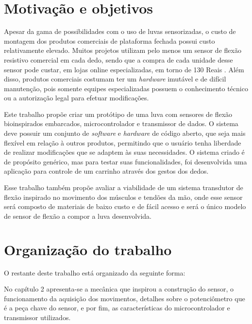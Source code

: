 \documentclass[
	12pt,				%
	openright,			%
	oneside,			%
	a4paper,			%
	english,			%
	brazil				%
	]{abntex2}
\begin{document}

		
		
		
		\section{Motivação e objetivos}

		Apesar da gama de possibilidades com o uso de luvas sensorizadas, o custo de montagem dos produtos comerciais de plataforma fechada possui custo relativamente elevado. Muitos projetos utilizam pelo menos um sensor de flexão resistivo comercial em cada dedo, sendo que a compra de cada unidade desse sensor pode custar, em lojas online especializadas, em torno de 130 Reais \cite{multilogicaflexsensor}. Além disso, produtos comerciais costumam ter um \textit{hardware} imutável e de difícil manutenção, pois somente equipes especializadas possuem o conhecimento técnico ou a autorização legal para efetuar modificações.

		Este trabalho propõe criar um protótipo de uma luva com sensores de flexão bioinspirados embarcados, microcontrolador e transmissor de dados. O sistema deve possuir um conjunto de \textit{software} e \textit{hardware} de código aberto, que seja mais flexível em relação à outros produtos, permitindo que o usuário tenha liberdade de realizar modificações que se adaptem às suas necessidades. O sistema criado é de propósito genérico, mas para testar suas funcionalidades, foi desenvolvida uma aplicação para controle de um carrinho através dos gestos dos dedos.

		Esse trabalho também propõe avaliar a viabilidade de um sistema transdutor de flexão inspirado no movimento dos músculos e tendões da mão, onde esse sensor será composto de materiais de baixo custo e de fácil acesso e será o único modelo de sensor de flexão a compor a luva desenvolvida.	
	
		\section{Organização do trabalho}

		O restante deste trabalho está organizado da seguinte forma:

		No capítulo 2 apresenta-se a mecânica que inspirou a construção do sensor, o funcionamento da aquisição dos movimentos, detalhes sobre o potenciômetro que é a peça chave do sensor, e por fim, as características do microcontrolador e transmissor utilizados.
		
\end{document}
